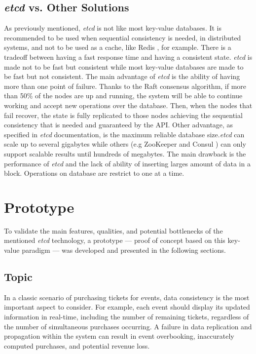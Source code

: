\documentclass[screen,review]{acmart}
\begin{document}
\subsection{\textit{etcd} vs. Other Solutions}
As previously mentioned, \textit{etcd} is not like most key-value databases. It is recommended to be used when sequential consistency is needed, in distributed systems, and not to be used as a cache, like Redis \cite{redis}, for example. There is a tradeoff between having a fast response time and having a consistent state. \textit{etcd} is made not to be fast but consistent while most key-value databases are made to be fast but not consistent.
The main advantage of \textit{etcd} is the ability of having more than one point of failure. Thanks to the Raft consensus algorithm, if more than 50\% of the nodes are up and running, the system will be able to continue working and accept new operations over the database. Then, when the nodes that fail recover, the state is fully replicated to those nodes achieving the sequential consistency that is needed and guaranteed by the API.
Other advantage, as specified in \textit{etcd} documentation, is the maximum reliable database size.\textit{etcd} can scale up to several gigabytes while others (e.g ZooKeeper \cite{zoo} and Consul \cite{consul}) can only support scalable results until hundreds of megabytes.
The main drawback is the performance of \textit{etcd} and the lack of ability of inserting larges amount of data in a block. Operations on database are restrict to one at a time.

\section{Prototype}
To validate the main features, qualities, and potential bottlenecks of the mentioned \textit{etcd} technology, a prototype — proof of concept based on this key-value paradigm — was developed and presented in the following sections.

\subsection{Topic}
In a classic scenario of purchasing tickets for events, data consistency is the most important aspect to consider. For example, each event should display its updated information in real-time, including the number of remaining tickets, regardless of the number of simultaneous purchases occurring. A failure in data replication and propagation within the system can result in event overbooking, inaccurately computed purchases, and potential revenue loss.
\end{document}
